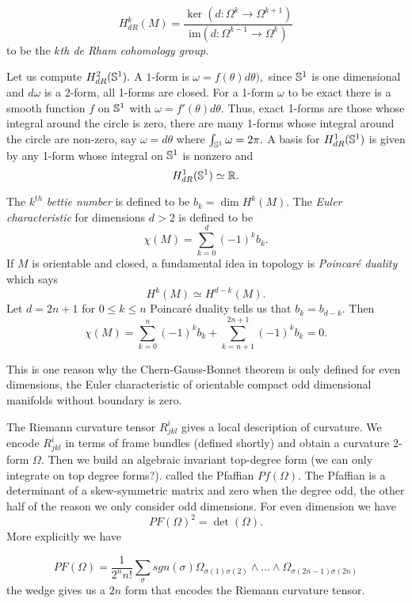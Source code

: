 $$H_{dR}^k(M)=\frac{\ker(d:\Omega^{k}\rightarrow \Omega^{k+1})}{\text{im}(d:\Omega^{k-1}\rightarrow \Omega^k)}$$
to be the \emph{$k$th de Rham cohomology group}.

Let us compute $H_{dR}^2(\mathbb{S}^1).$ A $1$-form is $\omega=f(\theta)d\theta),$ since $\mathbb{S}^1$ is one
dimensional and $d\omega$ is a 2-form, all 1-forms are closed. For a 1-form $\omega$ to be exact
there is a smooth function $f$ on $\mathbb{S}^1$ with $\omega=f'(\theta)d\theta$.
Thus, exact 1-forms are those whose integral around the circle is zero, there are many 1-forms
whose integral around the circle are non-zero, say $\omega=d\theta$ where $\int_{\mathbb{S}^1}\omega=2\pi.$
A basis for $H_{dR}^1(\mathbb{S}^1)$ is given by any 1-form whose integral on $\mathbb{S}^1$ is nonzero and
$$H_{dR}^1(\mathbb{S}^1)\simeq \mathbb{R}.$$


The $k^{th}$ \emph{bettie number} is defined to be $b_k=\dim H^k(M).$
The \emph{Euler characteristic} for dimensions $d>2$  is defined to be
$$\chi(M)=\sum_{k=0}^d(-1)^kb_k.$$
If $M$ is orientable and closed, a fundamental idea in topology is \emph{Poincar\'e duality} which says
$$H^k(M)\simeq H^{d-k}(M).$$
Let $d=2n+1$ for $0\leq k\leq n$ Poincar\'e duality tells us that $b_k=b_{d-k}.$
Then
$$\chi(M)=\sum_{k=0}^n(-1)^kb_k + \sum_{k=n+1}^{2n+1}(-1)^kb_k=0.$$

This is one reason why the Chern-Gauss-Bonnet theorem is only defined
for even dimensions, the Euler characteristic of orientable compact odd dimensional
manifolds without boundary is zero.

The Riemann curvature tensor $R^i_{jkl}$ gives a local description of curvature.
We encode $R^i_{jkl}$ in terms of frame bundles (defined shortly) and obtain
a curvature 2-form $\Omega$. Then we build an algebraic invariant top-degree form
(we can only integrate on top degree forms?). called the Pfaffian $Pf(\Omega)$.
The Pfaffian is a determinant of a skew-symmetric matrix and zero when the degree odd,
the other half of the reason we only consider odd dimensions.
For even dimension we have $$PF(\Omega)^2=\det(\Omega).$$
More explicitly we have 

$$PF(\Omega)=\frac{1}{2^n n!}\sum_{\sigma}sgn(\sigma)\Omega_{\sigma(1)\sigma(2)}\land \ldots \land \Omega_{\sigma(2n-1)\sigma(2n)}$$
the wedge gives us a $2n$ form that encodes the Riemann curvature tensor.

